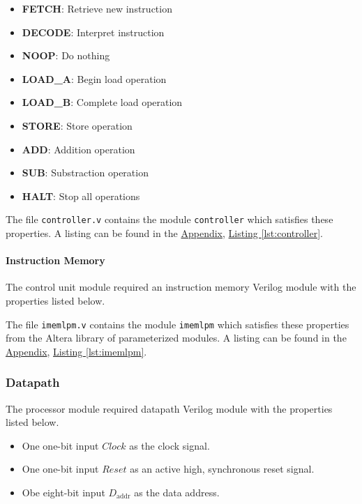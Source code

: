 \begin{itemize}
\begin{itemize}
        \item \textbf{FETCH}: Retrieve new instruction
        \item \textbf{DECODE}: Interpret instruction
        \item \textbf{NOOP}: Do nothing
        \item \textbf{LOAD\_A}: Begin load operation
        \item \textbf{LOAD\_B}: Complete load operation
        \item \textbf{STORE}: Store operation
        \item \textbf{ADD}: Addition operation
        \item \textbf{SUB}: Substraction operation
        \item \textbf{HALT}: Stop all operations
    \end{itemize}
\end{itemize}

The file \verb|controller.v| contains the module \verb|controller| which satisfies these properties.
A listing can be found in the \hyperref[sec:appendix]{Appendix}, \hyperref[lst:controller]{Listing \ref*{lst:controller}}.

\paragraph{Instruction Memory} \label{par:imem}

The control unit module required an instruction memory Verilog module with the properties listed below.


The file \verb|imemlpm.v| contains the module \verb|imemlpm| which satisfies these properties from the Altera library of parameterized modules.
A listing can be found in the \hyperref[sec:appendix]{Appendix}, \hyperref[lst:imemlpm]{Listing \ref*{lst:imemlpm}}.

\subsubsection{Datapath} \label{subsub:datapath}

The processor module required datapath Verilog module with the properties listed below.

\begin{itemize}
    \item One one-bit input $Clock$ as the clock signal.
    \item One one-bit input $Reset$ as an active high, synchronous reset signal.
    \item Obe eight-bit input $D_\text{addr}$ as the data address.
\end{itemize}

